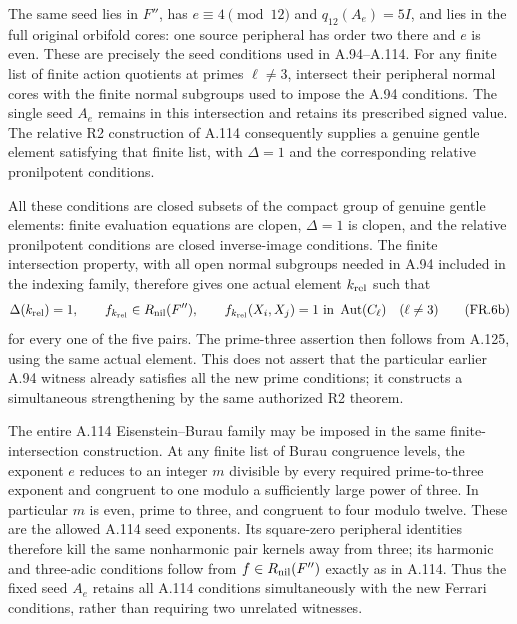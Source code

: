 The same seed lies in $F''$, has $e\equiv4\pmod{12}$ and
$q_{12}(A_e)=5I$, and lies in the full original orbifold cores:
one source peripheral has order two there and $e$ is even.
These are precisely the seed conditions used in A.94--A.114.
For any finite list of finite action quotients at primes
$\ell\ne3$, intersect their peripheral normal cores with
the finite normal subgroups used to impose the A.94 conditions.
The single seed $A_e$ remains in this intersection and retains
its prescribed signed value. The relative R2 construction of
A.114 consequently supplies a genuine gentle element satisfying
that finite list, with $\Delta=1$ and the corresponding
relative pronilpotent conditions.

All these conditions are closed subsets of the compact group
of genuine gentle elements: finite evaluation equations are
clopen, $\Delta=1$ is clopen, and the relative pronilpotent
conditions are closed inverse-image conditions. The finite
intersection property, with all open normal subgroups needed
in A.94 included in the indexing family, therefore gives one
actual element $k_{\rm rel}$ such that
\[
 \Delta(k_{\rm rel})=1,\qquad
 f_{k_{\rm rel}}\in R_{\rm nil}(F''),
 \qquad
 f_{k_{\rm rel}}(X_i,X_j)=1
       \text{ in }\operatorname{Aut}(C_\ell)
       \quad(\ell\ne3)
 \tag{FR.6b}
\]
for every one of the five pairs. The prime-three assertion
then follows from A.125, using the same actual element.
This does not assert that the particular earlier A.94 witness
already satisfies all the new prime conditions; it constructs
a simultaneous strengthening by the same authorized R2 theorem.

The entire A.114 Eisenstein--Burau family may be imposed in
the same finite-intersection construction. At any finite list
of Burau congruence levels, the exponent $e$ reduces to an
integer $m$ divisible by every required prime-to-three
exponent and congruent to one modulo a sufficiently large
power of three. In particular $m$ is even, prime to three,
and congruent to four modulo twelve. These are the allowed
A.114 seed exponents. Its square-zero peripheral identities
therefore kill the same nonharmonic pair kernels away from
three; its harmonic and three-adic conditions follow from
$f\in R_{\rm nil}(F'')$ exactly as in A.114. Thus the fixed
seed $A_e$ retains all A.114 conditions simultaneously with
the new Ferrari conditions, rather than requiring two
unrelated witnesses.

